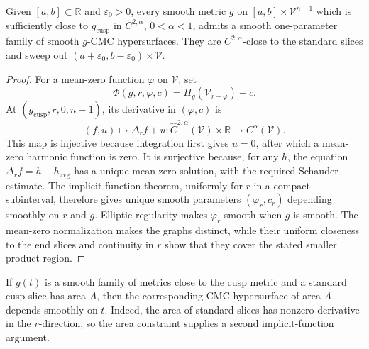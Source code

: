 \begin{proposition}
\label{prop:chow-iv-cmc-sweepout-almost-hyperbolic-cusp}
Given \([a,b]\subset\mathbb R\) and \(\varepsilon_0>0\), every smooth metric
\(g\) on \([a,b]\times\mathcal V^{n-1}\) which is sufficiently close to
\(g_{\mathrm{cusp}}\) in \(C^{2,\alpha}\), \(0<\alpha<1\), admits a smooth
one-parameter family of smooth \(g\)-CMC hypersurfaces.  They are
\(C^{2,\alpha}\)-close to the standard slices and sweep out
\((a+\varepsilon_0,b-\varepsilon_0)\times\mathcal V\).
\end{proposition}
\begin{proof}
For a mean-zero function \(\varphi\) on \(\mathcal V\), set
\[
 \Phi(g,r,\varphi,c)=H_g(\mathcal V_{r+\varphi})+c.
\]
At \((g_{\mathrm{cusp}},r,0,n-1)\), its derivative in \((\varphi,c)\) is
\[
 (f,u)\longmapsto\Delta_r f+u
 :\widehat C^{2,\alpha}(\mathcal V)\times\mathbb R
 \longrightarrow C^\alpha(\mathcal V).
\]
This map is injective because integration first gives \(u=0\), after which a
mean-zero harmonic function is zero.  It is surjective because, for any
\(h\), the equation \(\Delta_r f=h-h_{\mathrm{avg}}\) has a unique mean-zero
solution, with the required Schauder estimate.  The implicit function theorem,
uniformly for \(r\) in a compact subinterval, therefore gives unique smooth
parameters \((\varphi_r,c_r)\) depending smoothly on \(r\) and \(g\).
Elliptic regularity makes \(\varphi_r\) smooth when \(g\) is smooth.  The
mean-zero normalization makes the graphs distinct, while their uniform
closeness to the end slices and continuity in \(r\) show that they cover the
stated smaller product region.
\end{proof}

\begin{remark}
\label{rem:chow-iv-cmc-fixed-area-smooth-dependence}
If \(g(t)\) is a smooth family of metrics close to the cusp metric and a
standard cusp slice has area \(A\), then the corresponding CMC hypersurface of
area \(A\) depends smoothly on \(t\).  Indeed, the area of standard slices has
nonzero derivative in the \(r\)-direction, so the area constraint supplies a
second implicit-function argument.
\end{remark}

